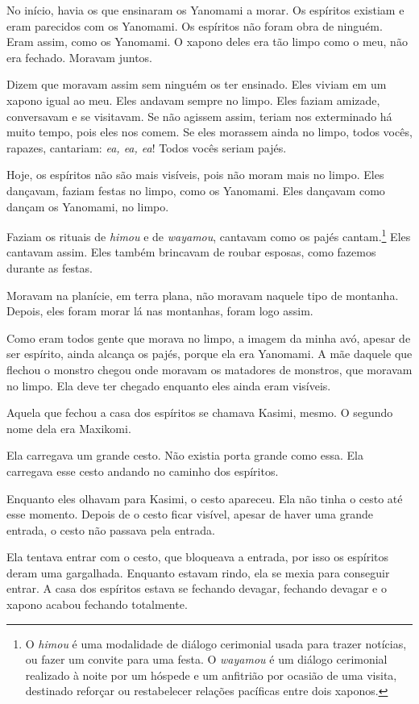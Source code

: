 No início, havia os que ensinaram os Yanomami a morar. Os espíritos
existiam e eram parecidos com os Yanomami. Os espíritos não foram obra
de ninguém. Eram assim, como os Yanomami. O xapono deles era tão limpo
como o meu, não era fechado. Moravam juntos. 

Dizem que moravam assim sem ninguém os ter ensinado. Eles viviam em um xapono
igual ao meu. Eles andavam sempre no limpo. Eles faziam amizade,
conversavam e se visitavam. Se não agissem assim, teriam nos exterminado
há muito tempo, pois eles nos comem. Se eles morassem ainda no limpo,
todos vocês, rapazes, cantariam: \textit{ea, ea, ea}! Todos vocês seriam
pajés. 

Hoje, os espíritos não são mais visíveis, pois não moram mais no limpo.
Eles dançavam, faziam festas no limpo, como os Yanomami. Eles dançavam
como dançam os Yanomami, no limpo. 

Faziam os rituais de \textit{himou} e de \textit{wayamou}, cantavam como os
pajés cantam.\footnote{O \textit{himou} é uma modalidade de diálogo cerimonial usada para trazer notícias, ou fazer um convite para uma festa. O \textit{wayamou} é um diálogo cerimonial realizado à noite por um hóspede e um anfitrião por ocasião de uma visita, destinado reforçar ou restabelecer relações pacíficas entre dois xaponos.} Eles cantavam assim. Eles também brincavam de roubar
esposas, como fazemos durante as festas. 

Moravam na planície, em terra plana, não moravam naquele tipo de
montanha. Depois, eles foram morar lá nas montanhas, foram logo assim. 

Como eram todos gente que morava no limpo, a imagem da minha avó, apesar
de ser espírito, ainda alcança os pajés, porque ela era Yanomami. A mãe
daquele que flechou o monstro chegou onde moravam os matadores de
monstros, que moravam no limpo. Ela deve ter chegado enquanto eles ainda
eram visíveis. 

Aquela que fechou a casa dos espíritos se chamava Kasimi, mesmo. O segundo nome dela era Maxikomi. 

Ela carregava um grande cesto. Não existia porta grande como essa. Ela
carregava esse cesto andando no caminho dos espíritos. 

Enquanto eles olhavam para Kasimi, o cesto apareceu. Ela não tinha
o cesto até esse momento. Depois de o cesto ficar visível, apesar de
haver uma grande entrada, o cesto não passava pela entrada. 

Ela tentava entrar com o cesto, que bloqueava a entrada, por isso os
espíritos deram uma gargalhada. Enquanto estavam rindo, ela se mexia
para conseguir entrar. A casa dos espíritos estava se fechando devagar,
fechando devagar e o xapono acabou fechando totalmente. 

